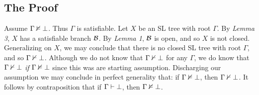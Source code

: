 






\subsection{The Proof}

Assume $\Gamma \nvDash \bot$.
Thus $\Gamma$ is satisfiable. 
Let $X$ be an SL tree with root $\Gamma$.
By \textit{Lemma 3}, $X$ has a satisfiable branch $\mathcal{B}$.
By \textit{Lemma 1}, $\mathcal{B}$ is open, and so $X$ is not closed. 
Generalizing on $X$, we may conclude that there is no closed SL tree with root $\Gamma$, and so $\Gamma \nvdash \bot$.
Although we do not know that $\Gamma \nvdash \bot$ for any $\Gamma$, we do know that $\Gamma \nvdash \bot$ \textit{if} $\Gamma \nvDash \bot$ since this was are starting assumption. 
Discharging our assumption we may conclude in perfect generality that: if $\Gamma \nvDash \bot$, then $\Gamma \nvdash \bot$.
It follows by contraposition that if $\Gamma \vdash \bot$, then $\Gamma \nvDash \bot$.











